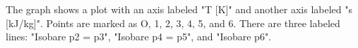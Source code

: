 The graph shows a plot with an axis labeled "T [K]" and another axis labeled "s [kJ/kg]". Points are marked as O, 1, 2, 3, 4, 5, and 6. There are three labeled lines: "Isobare p2 = p3", "Isobare p4 = p5", and "Isobare p6".